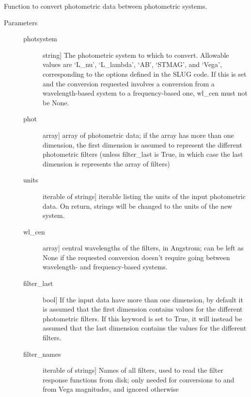 \documentclass[letterpaper,10pt,english]{sphinxmanual}
\begin{document}
\begin{fulllineitems}
\label{\detokenize{slugpy:slugpy.photometry_convert}}
Function to convert photometric data between photometric systems.
\begin{description}
\item[{Parameters}] \leavevmode\begin{description}
\item[{photsystem}] \leavevmode{[}string{]}
The photometric system to which to convert. Allowable values
are ‘L\_nu’, ‘L\_lambda’, ‘AB’, ‘STMAG’, and ‘Vega’,
corresponding to the options defined in the SLUG code. If this
is set and the conversion requested involves a conversion from
a wavelength-based system to a frequency-based one, wl\_cen must
not be None.

\item[{phot}] \leavevmode{[}array{]}
array of photometric data; if the array has more than one
dimension, the first dimension is assumed to represent the
different photometric filters (unless filter\_last is True,
in which case the last dimension is represents the array of
filters)

\item[{units}] \leavevmode{[}iterable of strings{]}
iterable listing the units of the input photometric data. On
return, strings will be changed to the units of the new system.

\item[{wl\_cen}] \leavevmode{[}array{]}
central wavelengths of the filters, in Angstrom; can be left as
None if the requested conversion doesn’t require going between
wavelength- and frequency-based systems.

\item[{filter\_last}] \leavevmode{[}bool{]}
If the input data have more than one dimension, by default it
is assumed that the first dimension contains values for the
different photometric filters. If this keyword is set to True,
it will instead be assumed that the last dimension contains the
values for the different filters.

\item[{filter\_names}] \leavevmode{[}iterable of strings{]}
Names of all filters, used to read the filter response
functions from disk; only needed for conversions to and from
Vega magnitudes, and ignored otherwise


\end{description}
\end{description}
\end{fulllineitems}
\end{document}
